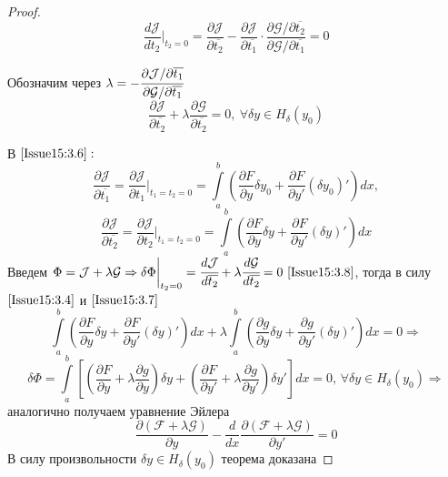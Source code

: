 \begin{proof}
\[ 
    \frac{d\mathcal{J}}{d t_2} \bigg|_{t_2=0} = \frac{\partial \mathcal{J}}{\partial \overline{t_2}} - \frac{\partial \mathcal{J}}{\partial \overline{t_1}}\cdot \frac{ \partial \mathcal{G}/\partial \overline{t_2}}{\partial \mathcal{G}/\partial \overline{t_1}}=0 
\]

Обозначим через $\lambda = -\cfrac{\partial\mathcal{J}/\partial \overline{t_1}}{\partial\mathcal{G} / \partial \overline{t_1}}$
\begin{equation}
\label{Issue15:3.8}
\frac{\partial\mathcal{J}}{\partial\overline{t_2}}+\lambda \frac{\partial\mathcal{G}}{\partial\overline{t_2}}=0, ~\forall\delta y \in H_\delta(y_0) \end{equation}
\par
В $\eqref{Issue15:3.6}:$
\begin{equation}
    \label{Issue15:3.7}
    \frac{\partial\mathcal{J}}{\partial \overline{t_1}}=\frac{\partial \mathcal{J}}{\partial t_1}\bigg|_{t_1=t_2=0}=\int\limits_a^b \left( \frac{\partial F}{\partial y}\delta y_0 + \frac{\partial F}{\partial y'}(\delta y_0)' \right) dx,
    \end{equation}
    \begin{equation*}
    \frac{\partial\mathcal{J}}{\partial \overline{t_2}}=\frac{\partial \mathcal{J}}{\partial t_2}\bigg|_{t_1=t_2=0}=\int\limits_a^b \left( \frac{\partial F}{\partial y}\delta y+\frac{\partial F}{\partial y'}(\delta y)' \right) dx
\end{equation*}
Введем $\Phi = \mathcal{J}+\lambda\mathcal{G}\Rightarrow \delta \Phi\bigg|_{t_2=0}=\cfrac{d\mathcal{J}}{d\overline{t_2}}+\lambda\cfrac{d\mathcal{G}}{d\overline{t_2}}=0 ~\eqref{Issue15:3.8}$, тогда в силу $\eqref{Issue15:3.4}$ и $\eqref{Issue15:3.7}$ $$\int\limits_a^b\left(\frac{\partial F}{\partial y}\delta y + \frac{\partial F}{\partial y'}(\delta y)'\right)d x+\lambda\int\limits_a^b\left(\frac{\partial g}{\partial y}\delta y + \frac{\partial g}{\partial y'}(\delta y)'\right)d x=0\Rightarrow$$$$ 
\delta \Phi =\int\limits_a^b\left[\left(\frac{\partial F}{\partial y}+ \lambda\frac{\partial g}{\partial y}\right)\delta y + \left(\frac{\partial F}{\partial y'}+ \lambda\frac{\partial g}{\partial y'}\right)\delta y'\right]dx = 0, \, \forall \delta y \in H_\delta(y_0)\Rightarrow$$
аналогично получаем уравнение Эйлера
$$\frac{\partial(\mathcal{F}+\lambda\mathcal{G})}{\partial y}-\frac{d}{dx}\frac{\partial(\mathcal{F}+\lambda\mathcal{G})}{\partial y'}=0$$
В силу произвольности $\delta y\in H_\delta(y_0)$ теорема доказана
\end{proof}

